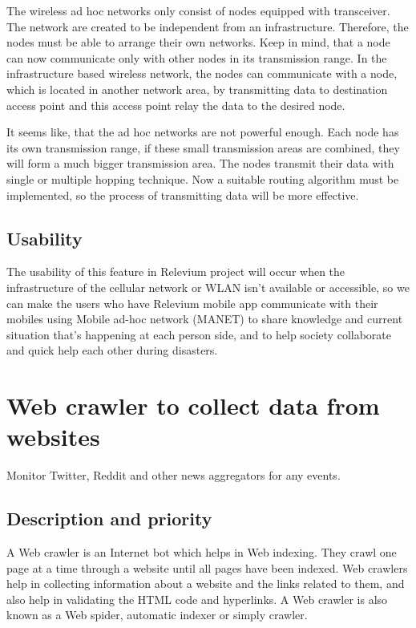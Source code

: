 \documentclass{scrreprt}
\begin{document}
The wireless ad hoc networks only consist of nodes
equipped with transceiver. The network are created to be
independent from an infrastructure. Therefore, the nodes must
be able to arrange their own networks. Keep in mind, that
a node can now communicate only with other nodes in
its transmission range. In the infrastructure based wireless
network, the nodes can communicate with a node, which
is located in another network area, by transmitting data to
destination access point and this access point relay the data to
the desired node.

It seems like, that the ad hoc networks are not powerful
enough. Each node has its own transmission range, if these
small transmission areas are combined, they will form a much
bigger transmission area. The nodes transmit their data with
single or multiple hopping technique. Now a suitable routing
algorithm must be implemented, so the process of transmitting
data will be more effective.

\subsection{Usability}

The usability of this feature in Relevium project will occur when the infrastructure of the cellular network or WLAN isn’t available or accessible, so we can make the users who have Relevium mobile app communicate with their mobiles using Mobile ad-hoc network (MANET) to share knowledge and current situation that’s happening at each person side, and to help society collaborate and quick help each other during disasters.




\newpage
\section{Web crawler to collect data from websites}
Monitor Twitter, Reddit and other news aggregators for any events.


\subsection{Description and priority}
A Web crawler is an Internet bot which helps in Web indexing. They crawl one page at a time through a website until all pages have been indexed. Web crawlers help in collecting information about a website and the links related to them, and also help in validating the HTML code and hyperlinks.
A Web crawler is also known as a Web spider, automatic indexer or simply crawler.
\end{document}
